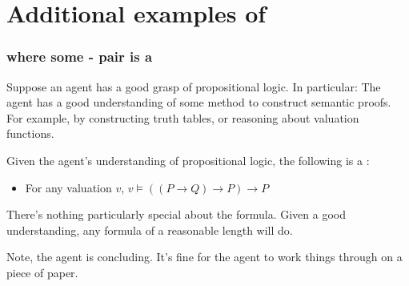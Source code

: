 \chapter{Additional examples of }
\label{cha:addit-exampl-fcs1}


\subsection{ where some - pair is a \fc{}}

\begin{note}
  \begin{scenario}
    \label{illu:sketch:prop-logic}
    Suppose an agent has a good grasp of propositional logic.
    In particular:
    The agent has a good understanding of some method to construct semantic proofs.
    For example, by constructing truth tables, or reasoning about valuation functions.
  \end{scenario}

  Given the agent's understanding of propositional logic, the following is a \fc{}:
  \begin{itemize}
  \item
    For any valuation \(v\), \(v \vDash ((P \rightarrow Q) \rightarrow P) \rightarrow P \)
  \end{itemize}

  There's nothing particularly special about the formula.
  Given a good understanding, any formula of a reasonable length will do.

  Note, the agent is concluding.
  It's fine for the agent to work things through on a piece of paper.
\end{note}


